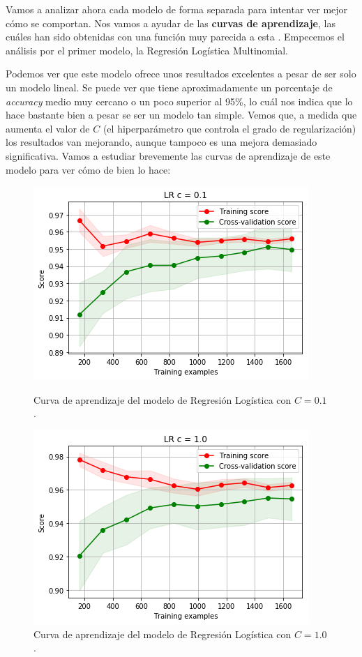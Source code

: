 \documentclass[11pt,a4paper]{article}
\begin{document}
Vamos a analizar ahora cada modelo de forma separada para intentar ver mejor cómo se comportan. Nos vamos a ayudar de las \textbf{curvas de aprendizaje},
las cuáles han sido obtenidas con una función muy parecida a esta \cite{bib:learning_curve}. Empecemos el análisis por el primer modelo, la
Regresión Logística Multinomial.

Podemos ver que este modelo ofrece unos resultados excelentes a pesar de ser solo un modelo lineal. Se puede ver que tiene aproximadamente
un porcentaje de \textit{accuracy} medio muy cercano o un poco superior al 95\%, lo cuál nos indica que lo hace bastante bien a pesar se ser
un modelo tan simple. Vemos que, a medida que aumenta el valor de $C$ (el hiperparámetro que controla el grado de regularización) los resultados
van mejorando, aunque tampoco es una mejora demasiado significativa. Vamos a estudiar brevemente las curvas de aprendizaje de este modelo para
ver cómo de bien lo hace:

\begin{figure}[H]
\centering
\begin{minipage}{.5\textwidth}
    \centering
    \includegraphics[scale=0.4]{img/lc-lr-c-01.png}
    \caption{Curva de aprendizaje del modelo de Regresión Logística con $C=0.1$.}
    \label{fig:lc-lr-c-01}
\end{minipage}%
\begin{minipage}{.5\textwidth}
    \centering
    \includegraphics[scale=0.4]{img/lc-lr-c-1.png}
    \caption{Curva de aprendizaje del modelo de Regresión Logística con $C=1.0$.}
    \label{fig:lc-lr-c-1}
\end{minipage}
\end{figure}
\end{document}
